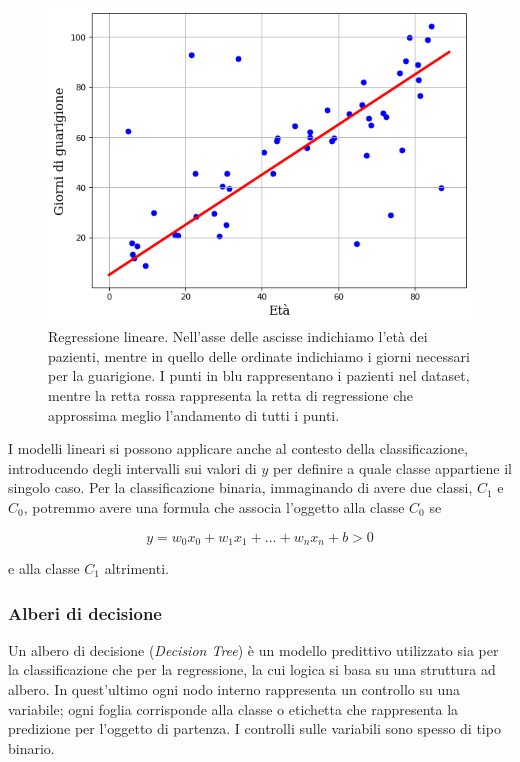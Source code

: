 \documentclass[a4paper,12pt]{report}
\begin{document}
\begin{figure}[h]
    \centering
    \includegraphics[scale=0.7]{images/regressione_lineare.png}
    \caption{Regressione lineare. Nell'asse delle ascisse indichiamo l'età dei pazienti, mentre in quello delle ordinate indichiamo i giorni necessari per la guarigione. I punti in blu rappresentano i pazienti nel dataset, mentre la retta rossa rappresenta la retta di regressione che approssima meglio l'andamento di tutti i punti.}
    \label{fig:linear_regression}

\end{figure}


I modelli lineari si possono applicare anche al contesto della classificazione, introducendo degli intervalli sui valori di $y$ per definire a quale classe appartiene il singolo caso. 
Per la classificazione binaria, immaginando di avere due classi, $C_1$ e $C_0$, potremmo avere una formula che associa l'oggetto alla classe $C_0$ se

\begin{equation*}
    y = w_0x_0 + w_1x_1 + \dots + w_nx_n + b > 0
\end{equation*}

\noindent e alla classe $C_1$ altrimenti.


\subsubsection{Alberi di decisione}

Un albero di decisione (\textit{Decision Tree}) è un modello predittivo utilizzato sia per la classificazione che per la regressione, la cui logica si basa su una struttura ad albero. In quest'ultimo ogni nodo interno rappresenta un controllo su una variabile; ogni foglia corrisponde  alla classe o etichetta che rappresenta la predizione per l'oggetto di partenza.
I controlli sulle variabili sono spesso di tipo binario.
\end{document}

